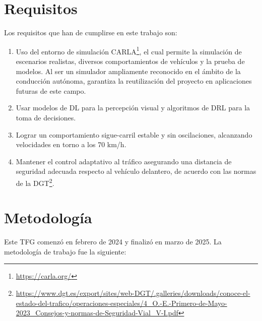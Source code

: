 \section{Requisitos}
\label{sec:requisitos}

Los requisitos que han de cumplirse en este trabajo son:
\begin{enumerate}
\item Uso del entorno de simulación CARLA\footnote{\url{https://carla.org/}}, el cual permite la simulación de escenarios realistas, diversos comportamientos de vehículos y la prueba de modelos. Al ser un simulador ampliamente reconocido en el ámbito de la conducción autónoma, garantiza la reutilización del proyecto en aplicaciones futuras de este campo.
\item Usar modelos de \ac{DL} para la percepción visual y algoritmos de \ac{DRL} para la toma de decisiones.
\item Lograr un comportamiento sigue-carril estable y sin oscilaciones, alcanzando velocidades en torno a los 70 km/h.
\item Mantener el control adaptativo al tráfico asegurando una distancia de seguridad adecuada respecto al vehículo delantero, de acuerdo con las normas de la \ac{DGT}\footnote{\url{https://www.dgt.es/export/sites/web-DGT/.galleries/downloads/conoce-el-estado-del-trafico/operaciones-especiales/4_O.-E.-Primero-de-Mayo-2023_Consejos-y-normas-de-Seguridad-Vial_V-I.pdf}}.
\end{enumerate}

\section{Metodología}
\label{sec:metodologia}

Este TFG comenzó en febrero de 2024 y finalizó en marzo de 2025. La metodología de trabajo fue la siguiente:

